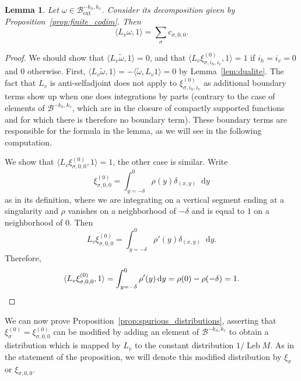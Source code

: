\documentclass[10pt]{amsart}
\newcommand{\ext}{\mathrm{ext}}
\newcommand{\boB}{\mathcal{B}}
\newcommand{\dd}{\mathop{}\!\mathrm{d}}
\DeclareMathOperator{\Leb}{Leb}
\newtheorem{lem}[thm]{Lemma}
\theoremstyle{definition}
\numberwithin{equation}{section}
\begin{document}
\begin{lem}
\label{lem:duality_ext} Let $\omega \in \boB^{-k_h, k_v}_{\ext}$. Consider its
decomposition given by Proposition~\ref{prop:finite_codim}. Then
\begin{equation*}
\langle L_v \omega, 1 \rangle = \sum_{\sigma} c_{\sigma, 0, 0}.
\end{equation*}
\end{lem}
\begin{proof}
We should show that $\langle L_v \tilde \omega, 1 \rangle = 0$, and that
$\langle L_v\xi^{(0)}_{\sigma, i_h, i_v}, 1\rangle = 1$ if $i_h=i_v=0$ and
$0$ otherwise. First, $\langle L_v \tilde \omega, 1 \rangle = - \langle
\tilde\omega, L_v 1 \rangle = 0$ by Lemma~\ref{lem:dualite}. The fact that
$L_v$ is anti-selfadjoint does not apply to $\xi^{(0)}_{\sigma, i_h, i_v}$ as
additional boundary terms show up when one does integrations by parts
(contrary to the case of elements of $\boB^{-k_h, k_v}$, which are in the
closure of compactly supported functions and for which there is therefore no
boundary term). These boundary terms are responsible for the formula in the
lemma, as we will see in the following computation.

We show that $\langle L_v\xi^{(0)}_{\sigma, 0, 0}, 1\rangle = 1$, the other
case is similar. Write
\[
\xi^{(0)}_{\sigma, 0, 0} = \int_{y=-\delta}^{0}
\rho(y) \delta_{(x,y)} \dd y
\]
as in its definition, where we are integrating
on a vertical segment ending at a singularity and $\rho$ vanishes on a
neighborhood of $-\delta$ and is equal to $1$ on a neighborhood of $0$. Then
\[
L_v \xi^{(0)}_{\sigma, 0, 0} = \int_{y=-\delta}^{0} \rho'(y) \delta_{(x,y)}
\dd y.
\]
Therefore,
\begin{equation*}
\langle L_v \xi^{(0)}_{\sigma, 0, 0}, 1 \rangle = \int_{y=-\delta}^{0} \rho'(y) \dd y
= \rho (0) - \rho(-\delta) = 1.
\qedhere
\end{equation*}
\end{proof}

We can now prove Proposition~\ref{prop:spurious_distributions}, asserting
that $\xi^{(0)}_\sigma = \xi^{(0)}_{\sigma, 0, 0}$ can be modified by adding
an element of $\boB^{-k_h, k_v}$ to obtain a distribution which is mapped by
$L_v$ to the constant distribution $1/\Leb M$. As in the statement of the
proposition, we will denote this modified distribution by $\xi_\sigma$ or
$\xi_{\sigma,0,0}$.
\end{document}

